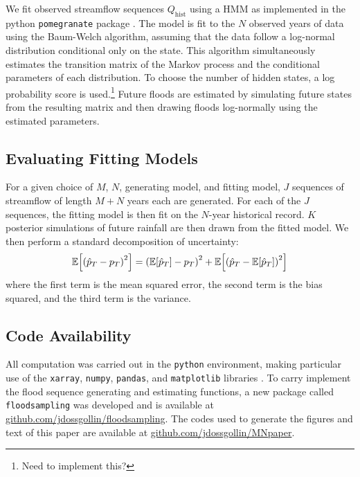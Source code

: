\documentclass[12pt]{article}
\begin{document}
We fit observed streamflow sequences \(Q_\text{hist}\) using a HMM as implemented in the python \texttt{pomegranate} package \citep{Schreiber2016}.
The model is fit to the \(N\) observed years of data using the Baum-Welch algorithm, assuming that the data follow a log-normal distribution conditional only on the state.
This algorithm simultaneously estimates the transition matrix of the Markov process and the conditional parameters of each distribution.
To choose the number of hidden states, a log probability score is used.\footnote{Need to implement this?}
Future floods are estimated by simulating future states from the resulting matrix and then drawing floods log-normally using the estimated parameters.

\subsection{Evaluating Fitting Models}

For a given choice of \(M\), \(N\), generating model, and fitting model, \(J\) sequences of streamflow of length \(M+N\) years each are generated.
For each of the \(J\) sequences, the fitting model is then fit on the \(N\)-year historical record.
\(K\) posterior simulations of future rainfall are then drawn from the fitted model.
We then perform a standard decomposition of uncertainty:
\begin{equation}
  \mathbb{E} \qty[ \qty( \hat{p}_T - p_T )^2 ] = \qty( \mathbb{E} \qty[ \hat{p}_T ] - p_T )^2 + \mathbb{E} \qty[ \qty( \hat{p}_T - \mathbb{E} \qty[ \hat{p}_T ] )^2]
\end{equation}
where the first term is the mean squared error, the second term is the bias squared, and the third term is the variance.

\subsection{Code Availability}

All computation was carried out in the \texttt{python} environment, making particular use of the \texttt{xarray}, \texttt{numpy}, \texttt{pandas}, and \texttt{matplotlib} libraries \citep{Hoyer2017,vanderWalt2011,McKinney2010,Hunter2007}.
To carry implement the flood sequence generating and estimating functions, a new package called \texttt{floodsampling} was developed and is available at \url{github.com/jdossgollin/floodsampling}.
The codes used to generate the figures and text of this paper are available at \url{github.com/jdossgollin/MNpaper}.
\end{document}
